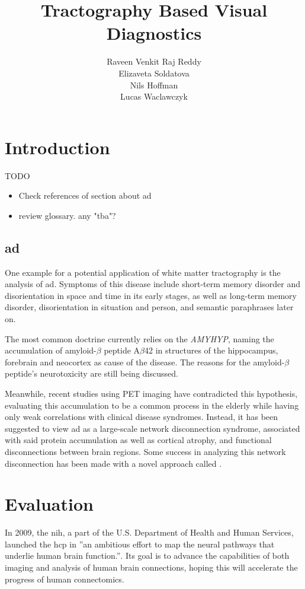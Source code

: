 \documentclass[plainreport]{cgvpub}
\author{Raveen Venkit Raj Reddy\\Elizaveta Soldatova\\Nils Hoffman\\Lucas Waclawczyk}
\title{Tractography Based Visual Diagnostics}
\newcommand{\newcite}[1]{\textsuperscript{\cite{#1}}}
\begin{document}
	\glsaddall
	\chapter{Introduction}
	TODO
	\begin{itemize}
		\item Check references of section about ad
		\item review glossary. any "tba"?
	\end{itemize}

	\section{\acrfull{ad}}
	One example for a potential application of white matter tractography is the analysis of \acrfull{ad}. Symptoms of this disease include short-term memory disorder and disorientation in space and time in its early stages, as well as long-term memory disorder, disorientation in situation and person, and semantic paraphrases later on. 
	
	The most common doctrine currently relies on the \emph{\gls{AMYHYP}}, naming the accumulation of amyloid-$ \beta $ peptide A$ \beta $42 in structures of the hippocampus, forebrain and neocortex as cause of the disease. The reasons for the amyloid-$ \beta $ peptide's neurotoxicity are still being discussed\newcite{ad_haass}. 
	
	Meanwhile, recent studies using PET imaging have contradicted this hypothesis, evaluating this accumulation to be a common process in the elderly while having only weak correlations with clinical disease syndromes. Instead, it has been suggested to view \acrshort{ad} as a large-scale network disconnection syndrome, associated with said protein accumulation as well as cortical atrophy, and functional disconnections between brain regions. Some success in analyzing this network disconnection has been made with a novel approach called \newcite{ad}.
	
	\chapter{Evaluation}
	In 2009, the \acrfull{nih}, a part of the U.S. Department of Health and Human Services\newcite{nih_about}, launched the \acrfull{hcp} in ''an ambitious effort to map the neural pathways that underlie human brain function.''\newcite{nih_connectome}. Its goal is to advance the capabilities of both imaging and analysis of human brain connections, hoping this will accelerate the progress of human connectomics. 
	
\end{document}
